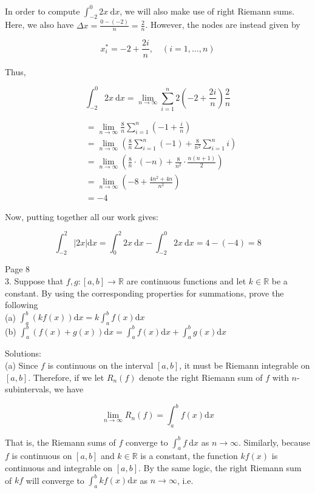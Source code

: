 \documentclass[10pt]{article}
\begin{document}
In order to compute $\int_{-2}^{0} 2 x \mathrm{~d} x$, we will also make use of right Riemann sums. Here, we also have $\Delta x=\frac{0-(-2)}{n}=\frac{2}{n}$. However, the nodes are instead given by

$$
x_{i}^{*}=-2+\frac{2 i}{n}, \quad(i=1, \ldots, n)
$$

Thus,

$$
\int_{-2}^{0} 2 x \mathrm{~d} x=\lim _{n \rightarrow \infty} \sum_{i=1}^{n} 2\left(-2+\frac{2 i}{n}\right) \frac{2}{n}
$$

$$
\begin{aligned}
& =\lim _{n \rightarrow \infty} \frac{8}{n} \sum_{i=1}^{n}\left(-1+\frac{i}{n}\right) \\
& =\lim _{n \rightarrow \infty}\left(\frac{8}{n} \sum_{i=1}^{n}(-1)+\frac{8}{n^{2}} \sum_{i=1}^{n} i\right) \\
& =\lim _{n \rightarrow \infty}\left(\frac{8}{n} \cdot(-n)+\frac{8}{n^{2}} \cdot \frac{n(n+1)}{2}\right) \\
& =\lim _{n \rightarrow \infty}\left(-8+\frac{4 n^{2}+4 n}{n^{2}}\right) \\
& =-4
\end{aligned}
$$

Now, putting together all our work gives:

$$
\int_{-2}^{2}|2 x| \mathrm{d} x=\int_{0}^{2} 2 x \mathrm{~d} x-\int_{-2}^{0} 2 x \mathrm{~d} x=4-(-4)=8
$$

Page 8\\
3. Suppose that $f, g:[a, b] \rightarrow \mathbb{R}$ are continuous functions and let $k \in \mathbb{R}$ be a constant. By using the corresponding properties for summations, prove the following\\
(a) $\int_{a}^{b}(k f(x)) \mathrm{d} x=k \int_{a}^{b} f(x) \mathrm{d} x$\\
(b) $\int_{a}^{b}(f(x)+g(x)) \mathrm{d} x=\int_{a}^{b} f(x) \mathrm{d} x+\int_{a}^{b} g(x) \mathrm{d} x$

Solutions:\\
(a) Since $f$ is continuous on the interval $[a, b]$, it must be Riemann integrable on $[a, b]$. Therefore, if we let $R_{n}(f)$ denote the right Riemann sum of $f$ with $n$-subintervals, we have


\begin{equation*}
\lim _{n \rightarrow \infty} R_{n}(f)=\int_{a}^{b} f(x) \mathrm{d} x \tag{1}
\end{equation*}


That is, the Riemann sums of $f$ converge to $\int_{a}^{b} f \mathrm{~d} x$ as $n \rightarrow \infty$. Similarly, because $f$ is continuous on $[a, b]$ and $k \in \mathbb{R}$ is a constant, the function $k f(x)$ is continuous and integrable on $[a, b]$. By the same logic, the right Riemann sum of $k f$ will converge to $\int_{a}^{b} k f(x) \mathrm{d} x$ as $n \rightarrow \infty$, i.e.
\end{document}
